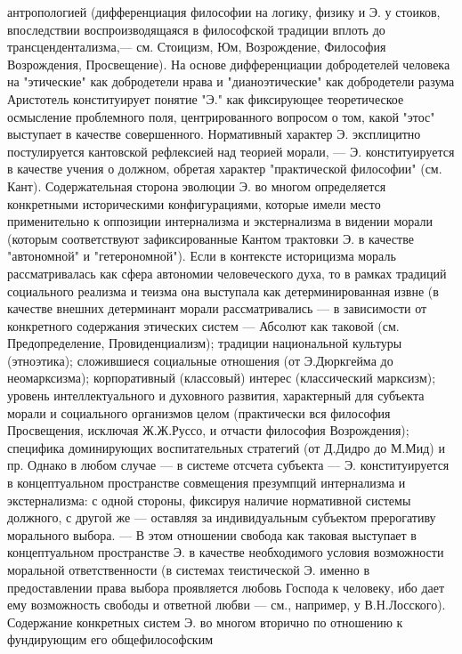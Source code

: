 \documentclass[12pt]{article}
\begin{document}
антропологией  (дифференциация  философии  на  логику,  физику  и  Э.  у  стоиков,  впоследствии
воспроизводящаяся  в  философской  традиции  вплоть  до  трансцендентализма,—  см.  Стоицизм,  Юм,
Возрождение, Философия Возрождения, Просвещение). На основе дифференциации добродетелей человека на
"этические" как добродетели нрава и  "дианоэтические" как добродетели разума  Аристотель конституирует
понятие "Э." как фиксирующее теоретическое осмысление проблемного поля, центрированного вопросом о том,
какой  "этос"  выступает  в  качестве  совершенного.  Нормативный  характер  Э.  эксплицитно  постулируется
кантовской рефлексией над теорией морали, — Э. конституируется в качестве учения о должном, обретая
характер "практической философии" (см. Кант). Содержательная сторона эволюции Э. во многом определяется
конкретными историческими конфигурациями, которые имели место применительно к оппозиции интернализма
и экстернализма в видении морали (которым соответствуют зафиксированные Кантом трактовки Э. в качестве
"автономной" и "гетерономной"). Если в контексте историцизма мораль рассматривалась как сфера автономии
человеческого  духа,  то  в  рамках  традиций  социального  реализма  и  теизма  она  выступала  как
детерминированная  извне  (в  качестве  внешних  детерминант  морали  рассматривались  —  в  зависимости  от
конкретного содержания этических систем — Абсолют как таковой (см. Предопределение, Провиденциализм);
традиции  национальной  культуры  (этноэтика);  сложившиеся  социальные  отношения  (от  Э.Дюркгейма  до
неомарксизма); корпоративный (классовый) интерес (классический марксизм); уровень интеллектуального и
духовного  развития,  характерный  для  субъекта  морали  и  социального  организмов  целом  (практически  вся
философия  Просвещения,  исключая  Ж.Ж.Руссо,  и  отчасти  философия  Возрождения);  специфика
доминирующих воспитательных стратегий (от Д.Дидро до М.Мид) и пр. Однако в любом случае — в системе
отсчета субъекта — Э. конституируется в концептуальном пространстве совмещения презумпций интернализма
и экстернализма: с одной стороны, фиксируя наличие нормативной системы должного, с другой же — оставляя
за индивидуальным субъектом прерогативу морального выбора. — В этом отношении свобода как таковая
выступает  в  концептуальном  пространстве  Э.  в  качестве  необходимого  условия  возможности  моральной
ответственности (в системах теистической Э. именно в предоставлении права выбора проявляется любовь
Господа к человеку, ибо дает ему возможность свободы и ответной любви — см., например, у В.Н.Лосского).
Содержание конкретных систем Э. во многом вторично по отношению к фундирующим его общефилософским
\end{document}
